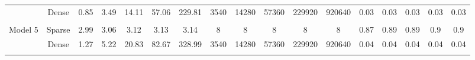 \documentclass[10pt,a4paper]{article}
\begin{document}
\begin{table}[!htbp]
\begin{center}
{\begin{tabular}{| c  c |  c  c  c  c  c  |  c  c  c  c  c  |  c  c  c  c  c  | }
 & Dense & 0.85 & 3.49 & 14.11 & 57.06 & 229.81 & 3540 & 14280 & 57360 & 229920 & 920640 & 0.03 & 0.03 & 0.03 & 0.03 & 0.03\\ 
\multicolumn{2}{|c|}{} & \multicolumn{5}{c|}{ } & \multicolumn{5}{c|}{ } & \multicolumn{5}{c|}{ } \\ 
	\multirow{2}{*}{Model 5} & Sparse & 2.99 & 3.06 & 3.12 & 3.13 & 3.14 & 8 & 8 & 8 & 8 & 8 & 0.87 & 0.89 & 0.89 & 0.9 & 0.9\\ 
 & Dense & 1.27 & 5.22 & 20.83 & 82.67 & 328.99 & 3540 & 14280 & 57360 & 229920 & 920640 & 0.04 & 0.04 & 0.04 & 0.04 & 0.04\\ 
\multicolumn{2}{|c|}{} & \multicolumn{5}{c|}{ } & \multicolumn{5}{c|}{ } & \multicolumn{5}{c|}{ } \\ 
 \hline\hline 
 \end{tabular}} 
 \end{center} 
 \end{table}


 
\end{document}
